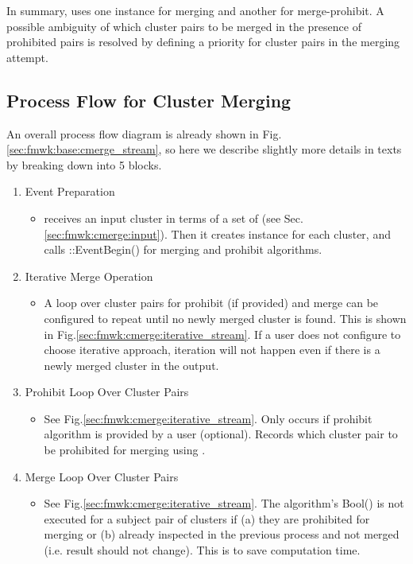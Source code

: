 In summary, {\cmerge} uses one {\cmalgo} instance for merging and another for merge-prohibit. A possible ambiguity of which cluster pairs to be merged in the presence of prohibited pairs is resolved by defining a priority for cluster pairs in the merging attempt. 

\subsection{Process Flow for Cluster Merging}
\label{sec:fmwk:cmerge:process_flow}
An overall process flow diagram is already shown in Fig.\ref{sec:fmwk:base:cmerge_stream}, so here we describe slightly more details in texts by breaking down into 5 blocks.
\begin{enumerate}
\item Event Preparation
  \begin{itemize}
    \item[] {\cmerge} receives an input cluster in terms of a set of {\pxhit} (see Sec.\ref{sec:fmwk:cmerge:input}). Then it creates {\cpan} instance for each cluster, and calls {\cmalgo::EventBegin()} for merging and prohibit algorithms.
  \end{itemize}

\item Iterative Merge Operation
  \begin{itemize}
    \item[] A loop over cluster pairs for prohibit (if provided) and merge {\cmalgo} can be configured to repeat until no newly merged cluster is found. This is shown in Fig.\ref{sec:fmwk:cmerge:iterative_stream}. If a user does not configure to choose iterative approach, iteration will not happen even if there is a newly merged cluster in the output.
  \end{itemize}

\item Prohibit {\cmalgo} Loop Over Cluster Pairs
  \begin{itemize}
    \item[] See Fig.\ref{sec:fmwk:cmerge:iterative_stream}. Only occurs if prohibit algorithm is provided by a user (optional). Records which cluster pair to be prohibited for merging using {\cbkeeper}.
  \end{itemize}

\item Merge {\cmalgo} Loop Over Cluster Pairs
  \begin{itemize}
    \item[] See Fig.\ref{sec:fmwk:cmerge:iterative_stream}. The algorithm's {\ttfamily Bool()} is not executed for a subject pair of clusters if (a) they are prohibited for merging or (b) already inspected in the previous process and not merged (i.e. result should not change). This is to save computation time.
  \end{itemize}


\end{enumerate}
